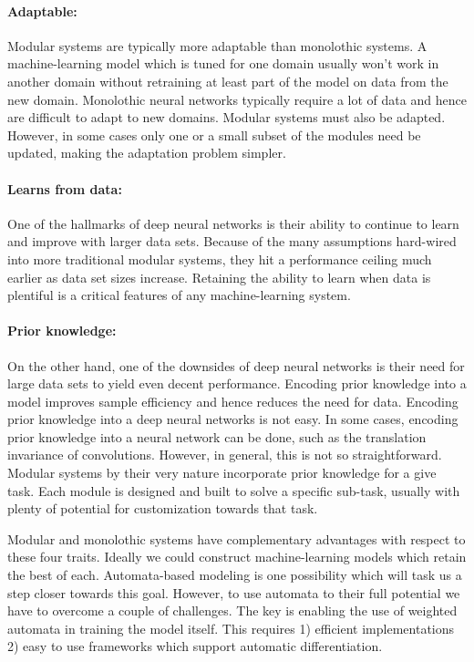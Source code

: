 \documentclass[main.tex]{subfiles}
\begin{document}
\paragraph{Adaptable:} Modular systems are typically more adaptable than
monolothic systems. A machine-learning model which is tuned for one domain
usually won't work in another domain without retraining at least part of the
model on data from the new domain. Monolothic neural networks typically require
a lot of data and hence are difficult to adapt to new domains. Modular systems
must also be adapted. However, in some cases only one or a small subset of the
modules need be updated, making the adaptation problem simpler.

\paragraph{Learns from data:} One of the hallmarks of deep neural networks is
their ability to continue to learn and improve with larger data sets. Because
of the many assumptions hard-wired into more traditional modular systems, they
hit a performance ceiling much earlier as data set sizes increase. Retaining
the ability to learn when data is plentiful is a critical features of any
machine-learning system.

\paragraph{Prior knowledge:} On the other hand, one of the downsides of deep
neural networks is their need for large data sets to yield even decent
performance. Encoding prior knowledge into a model improves sample efficiency
and hence reduces the need for data. Encoding prior knowledge into a deep
neural networks is not easy. In some cases, encoding prior knowledge into a
neural network can be done, such as the translation invariance of convolutions.
However, in general, this is not so straightforward. Modular systems by their
very nature incorporate prior knowledge for a give task. Each module is
designed and built to solve a specific sub-task, usually with plenty of
potential for customization towards that task.

Modular and monolothic systems have complementary advantages with respect to
these four traits. Ideally we could construct machine-learning models which
retain the best of each. Automata-based modeling is one possibility which will
task us a step closer towards this goal.  However, to use automata to their
full potential we have to overcome a couple of challenges. The key is enabling
the use of weighted automata in training the model itself. This requires 1)
efficient implementations 2) easy to use frameworks which support automatic
differentiation.
\end{document}
